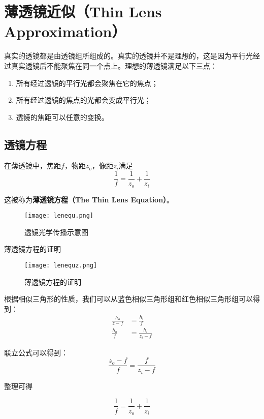 \documentclass[openany]{progbookcn}
\begin{document}
\section{薄透镜近似（Thin Lens Approximation）}

真实的透镜都是由透镜组所组成的。真实的透镜并不是理想的，这是因为平行光经过真实透镜后不能聚焦在同一个点上。理想的薄透镜满足以下三点：
\begin{enumerate}
	\item 所有经过透镜的平行光都会聚焦在它的焦点；
	\item 所有经过透镜的焦点的光都会变成平行光；
	\item 透镜的焦距可以任意的变换。
\end{enumerate}

\subsection{透镜方程}

在薄透镜中，焦距$f$，物距$z_o$，像距$z_i$满足
\begin{equation}
	\frac{1}{f}=\frac{1}{z_o}+\frac{1}{z_i}
\end{equation}

这被称为\textbf{薄透镜方程（The Thin Lens Equation）}。

\begin{figure}[H]
	\centering
	\texttt{[image: lenequ.png]}
	\caption{透镜光学传播示意图}
	\label{fig:lenequ}
\end{figure}

\begin{titledbox}{薄透镜方程的证明}
	
	\begin{figure}[H]
		\centering
		\texttt{[image: lenequz.png]}
		\caption{薄透镜方程的证明}
		\label{fig:lenequz}
	\end{figure}

根据相似三角形的性质，我们可以从蓝色相似三角形组和红色相似三角形组可以得到：
\begin{equation}
	\begin{split}
		\frac{h_o}{z-f}&=\frac{h_i}{f}\\
		\frac{h_o}{f}&=\frac{h_i}{z_i-f}
	\end{split}
\end{equation}

联立公式可以得到：
\begin{equation}
	\frac{z_o-f}{f}=\frac{f}{z_i-f}
\end{equation}

整理可得

\begin{equation}
	\frac{1}{f}=\frac{1}{z_o}+\frac{1}{z_i}
\end{equation}
	
\end{titledbox}
\end{document}
